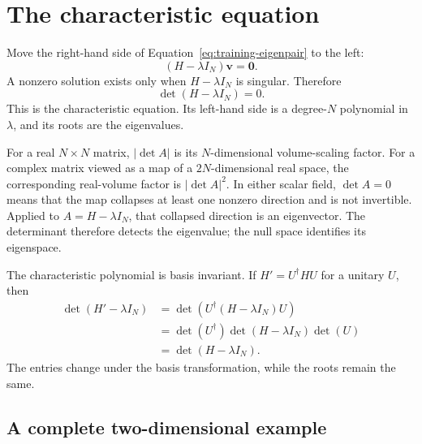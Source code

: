 \section{The characteristic equation}

Move the right-hand side of Equation~\eqref{eq:training-eigenpair} to the left:
\begin{equation}
  (H-\lambda I_N)\mathbf v=\mathbf 0.
\end{equation}
A nonzero solution exists only when \(H-\lambda I_N\) is singular. Therefore
\begin{equation}
  \det(H-\lambda I_N)=0.
  \label{eq:training-matrix-characteristic-equation}
\end{equation}
This is the characteristic equation. Its left-hand side is a degree-\(N\)
polynomial in \(\lambda\), and its roots are the eigenvalues.

For a real \(N\times N\) matrix, \(|\det A|\) is its
\(N\)-dimensional volume-scaling factor. For a complex matrix viewed as a map
of a \(2N\)-dimensional real space, the corresponding real-volume factor is
\(|\det A|^2\). In either scalar field, \(\det A=0\) means that the map
collapses at least one nonzero direction and is not invertible. Applied to
\(A=H-\lambda I_N\), that collapsed direction is an eigenvector. The
determinant therefore detects the eigenvalue; the null space identifies its
eigenspace.

The characteristic polynomial is basis invariant. If
\(H'=U^{\dagger}HU\) for a unitary \(U\), then
\begin{align}
  \det(H'-\lambda I_N)
  &=\det\!\left(U^{\dagger}(H-\lambda I_N)U\right)\\
  &=\det(U^{\dagger})\det(H-\lambda I_N)\det(U)\\
  &=\det(H-\lambda I_N).
\end{align}
The entries change under the basis transformation, while the roots remain the
same.

\subsection{A complete two-dimensional example}

